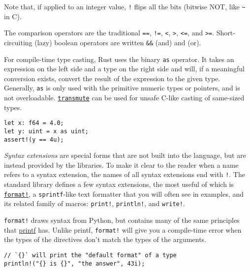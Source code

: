 \documentclass[]{article}
\begin{document}
Note that, if applied to an integer value, \texttt{!} flips all the bits
(bitwise NOT, like \texttt{\textasciitilde{}} in C).

The comparison operators are the traditional \texttt{==}, \texttt{!=},
\texttt{\textless{}}, \texttt{\textgreater{}}, \texttt{\textless{}=},
and \texttt{\textgreater{}=}. Short-circuiting (lazy) boolean operators
are written \texttt{\&\&} (and) and \texttt{\textbar{}\textbar{}} (or).

For compile-time type casting, Rust uses the binary \texttt{as}
operator. It takes an expression on the left side and a type on the
right side and will, if a meaningful conversion exists, convert the
result of the expression to the given type. Generally, \texttt{as} is
only used with the primitive numeric types or pointers, and is not
overloadable.
\href{http://doc.rust-lang.org/std/mem/fn.transmute.html}{\texttt{transmute}}
can be used for unsafe C-like casting of same-sized types.

\begin{verbatim}
let x: f64 = 4.0;
let y: uint = x as uint;
assert!(y == 4u);
\end{verbatim}


\emph{Syntax extensions} are special forms that are not built into the
language, but are instead provided by the libraries. To make it clear to
the reader when a name refers to a syntax extension, the names of all
syntax extensions end with \texttt{!}. The standard library defines a
few syntax extensions, the most useful of which is
\href{http://doc.rust-lang.org/std/fmt/}{\texttt{format!}}, a
\texttt{sprintf}-like text formatter that you will often see in
examples, and its related family of macros: \texttt{print!},
\texttt{println!}, and \texttt{write!}.

\texttt{format!} draws syntax from Python, but contains many of the same
principles that
\href{http://en.cppreference.com/w/cpp/io/c/fprintf}{printf} has. Unlike
printf, \texttt{format!} will give you a compile-time error when the
types of the directives don't match the types of the arguments.

\begin{verbatim}
// `{}` will print the "default format" of a type
println!("{} is {}", "the answer", 43i);
\end{verbatim}
\end{document}
